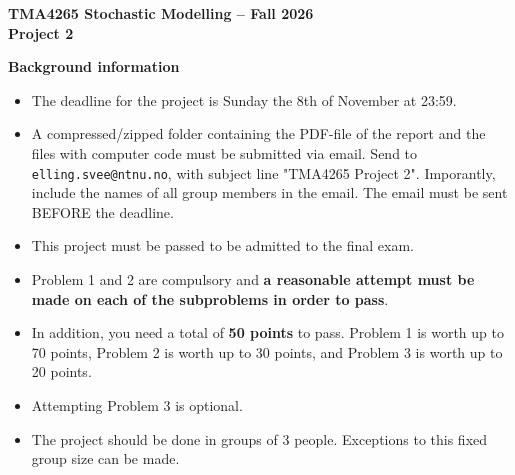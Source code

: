 \documentclass[1p]{article}		%
\title{}
\author{}
\begin{document}
\begin{center}\textbf{
{\huge{TMA4265 Stochastic Modelling -- Fall 2026}}\\ \vspace{3mm}
{\LARGE{  Project 2}}}\end{center}
\vspace{5mm}
{\LARGE \textbf{Background information}}\\
\begin{itemize}
  \item
    The deadline for the project is Sunday the 8th of November at 23:59.
  \item
    A compressed/zipped folder containing the PDF-file of the report and the files with computer code must be submitted via email. Send to \texttt{elling.svee@ntnu.no}, with subject line "TMA4265 Project 2". Imporantly, include the names of all group members in the email. The email must be sent BEFORE the deadline.
    \item
    This project must be passed to be admitted to the final exam. 
  \item Problem 1 and 2 are compulsory and \textbf{a reasonable attempt must be made on each of the subproblems in order to pass}.
    \item In addition, you need a total of \textbf{50 points} to pass. Problem 1 is worth up to 70 points, Problem 2 is worth up to 30 points, and Problem 3 is worth up to 20 points.
    \item Attempting Problem 3 is optional.
  \item
    The project should be done in groups of 3 people. Exceptions to this fixed group size can be made.


\end{itemize}
\end{document}
